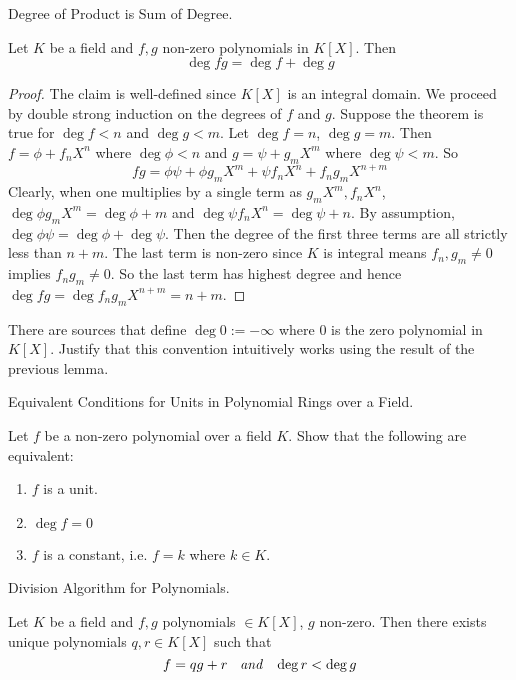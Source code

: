 \documentclass[../book.tex]{subfiles}
\begin{document}
\begin{lem} Degree of Product is Sum of Degree. 
    
    Let $K$ be a field and $f, g$ non-zero polynomials in $K[X]$. 
    Then \[\deg fg = \deg f + \deg g\]
\end{lem}
\begin{proof}
    The claim is well-defined since $K[X]$ is an integral domain.
    We proceed by double strong induction on the degrees of $f$ and $g$. 
    Suppose the theorem is true for $\deg f < n$ and $\deg g < m$. 
    Let $\deg f = n$, $\deg g = m$. 
    Then $f = \phi + f_n X^n$ where $\deg \phi < n$ and 
    $g = \psi + g_m X^m$ where $\deg \psi < m$. 
    So \[
    fg = \phi \psi + \phi g_m X^m + \psi f_n X^n + f_n g_m X^{n + m}
    \]
    Clearly, when one multiplies by a single term as $g_m X^m, f_n X^n$, 
    $\deg \phi g_m X^m = \deg \phi + m$ and $\deg \psi f_n X^n = \deg \psi + n$.
    By assumption, $\deg \phi\psi = \deg \phi + \deg \psi$.
    Then the degree of the first three terms are all strictly less than $n + m$.
    The last term is non-zero since $K$ is integral means $f_n, g_m \neq 0$
    implies $f_n g_m \neq 0$. 
    So the last term has highest degree and hence
    $\deg fg = \deg f_n g_m X^{n+m} = n + m$. 
\end{proof}
\begin{ex}
    There are sources that define $\deg 0 := -\infty$ where
    $0$ is the zero polynomial in $K[X]$.
    Justify that this convention intuitively works using the result of the previous lemma.
\end{ex}
\begin{ex} Equivalent Conditions for Units in Polynomial Rings over a Field.

    Let $f$ be a non-zero polynomial over a field $K$. 
    Show that the following are equivalent: \begin{enumerate}
        \item $f$ is a unit.
        \item $\deg f = 0$
        \item $f$ is a constant, i.e. $f = k$ where $k \in K$. 
    \end{enumerate}
\end{ex}
\begin{lem} Division Algorithm for Polynomials.
    
    Let $K$ be a field and $f, g$ polynomials $\in K[X]$, $g$ non-zero.
    Then there exists unique polynomials $q, r \in K[X]$ such that \[
        f = q g + r \;\;\emph{ and }\;\; \deg r < \deg g
    \]
\end{lem}
\end{document}
